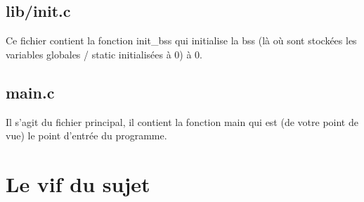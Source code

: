 \documentclass[a4paper,10pt]{article} %
\begin{document}
\subsection{lib/init.c}
Ce fichier contient la fonction init\_bss qui initialise la bss (là où sont stockées les variables globales / static initialisées à 0) à 0.

\subsection{main.c}
Il s'agit du fichier principal, il contient la fonction main qui est (de votre point de vue) le point d'entrée du programme.

\section{Le vif du sujet}
\end{document}

